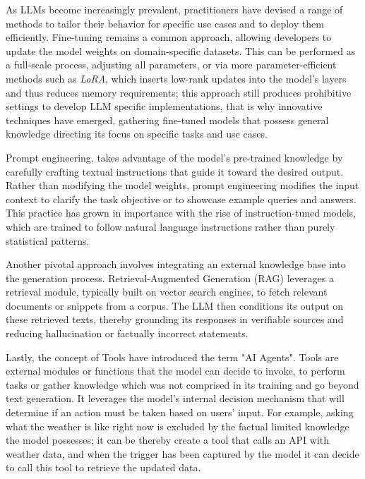 As LLMs become increasingly prevalent, practitioners have devised a range of methods to tailor their behavior for specific use cases and to deploy them efficiently. Fine-tuning remains a common approach, allowing developers to update the model weights on domain-specific datasets. This can be performed as a full-scale process, adjusting all parameters, or via more parameter-efficient methods such as \textit{LoRA}, \cite{hu2021lora} which inserts low-rank updates into the model’s layers and thus reduces memory requirements; this approach still produces prohibitive settings to develop LLM specific implementations, that is why innovative techniques have emerged, gathering fine-tuned models that possess general knowledge directing its focus on specific tasks and use cases.

Prompt engineering, takes advantage of the model’s pre-trained knowledge by carefully crafting textual instructions that guide it toward the desired output. \cite{liu2023promptsurvey} Rather than modifying the model weights, prompt engineering modifies the input context to clarify the task objective or to showcase example queries and answers. This practice has grown in importance with the rise of instruction-tuned models, which are trained to follow natural language instructions rather than purely statistical patterns.

Another pivotal approach involves integrating an external knowledge base into the generation process. Retrieval-Augmented Generation (RAG) \cite{lewis2020retrieval} leverages a retrieval module, typically built on vector search engines, to fetch relevant documents or snippets from a corpus. The LLM then conditions its output on these retrieved texts, thereby grounding its responses in verifiable sources and reducing hallucination or factually incorrect statements. \cite{ji2023surveyhallucination}

Lastly, the concept of Tools have introduced the term "AI Agents". Tools are external modules or functions that the model can decide to invoke, to perform tasks or gather knowledge which was not comprised in its training and go beyond text generation. It leverages the model's internal decision mechanism that will determine if an action must be taken based on users' input. For example, asking what the weather is like right now is excluded by the factual limited knowledge the model possesses; it can be thereby create a tool that calls an API with weather data, and when the trigger has been captured by the model it can decide to call this tool to retrieve the updated data.

